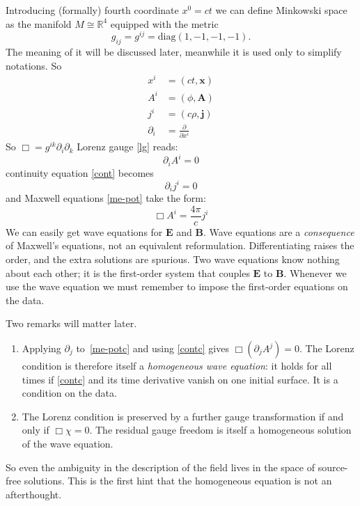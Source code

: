 Introducing (formally) fourth coordinate $ x^0=c t $ we can define
 Minkowski space as  the manifold $M \cong \mathbb{R}^4$ 
equipped with the  metric
\begin{equation}
   \label {minkg}
    g_{i j} = g^{i j}=\mathrm{diag}(1,-1,-1,-1).
\end{equation} 
The meaning of it will be discussed later, meanwhile
it is used only to simplify notations. So
\begin{align}
    x^i&=(ct,\bm x) \label{x4} \\
    A^i&=(\phi,\bm A) \label{a4}\\
    j^i&=(c \rho, \bm j) \label{j4}\\
    \partial_i&= \frac{\partial}{\partial x^i} \label{d4}
\end{align}
So $ \Box=g^{i k} \partial_i \partial_k $ 
Lorenz gauge \eqref{lg} reads:
\begin{equation}
   \label {lgc}
   \partial_i A^i=0
\end{equation} 
 continuity equation \eqref{cont} becomes
\begin{equation}
   \label {contc}
   \partial_i j^i=0
\end{equation} 
and Maxwell equations \eqref{me-pot} take the form:
\begin{equation}
   \label {me-potc}
    \Box A^i= \frac{4 \pi}{c} j^i
\end{equation}
We can easily get wave equations for $ \bm E $ and $\bm B$.
Wave equations are a \emph{consequence} of Maxwell's equations, not an
equivalent reformulation. Differentiating raises the order, and the extra
solutions are spurious. Two  wave equations know nothing
about each other; it is the first-order system that couples $\bm E$ to
$\bm B$. Whenever we use the wave equation we must remember to impose
the first-order equations on the data.

Two remarks will matter later.
\begin{enumerate}
\item Applying $\partial_j$ to~\eqref{me-potc} and using
\eqref{contc} gives $\Box(\partial_j A^j)=0$. The Lorenz
condition is therefore itself a \emph{homogeneous wave equation}: it holds
for all times if \eqref{contc} and its time derivative vanish on one
initial surface. It is a condition on the data.
\item The Lorenz condition is preserved by a further gauge transformation
if and only if $\Box\chi=0$. The residual gauge freedom is itself a
homogeneous solution of the wave equation.
\end{enumerate}
So even the ambiguity in the description of the field lives in the space of
source-free solutions. This is the first hint that the homogeneous equation
is not an afterthought.

